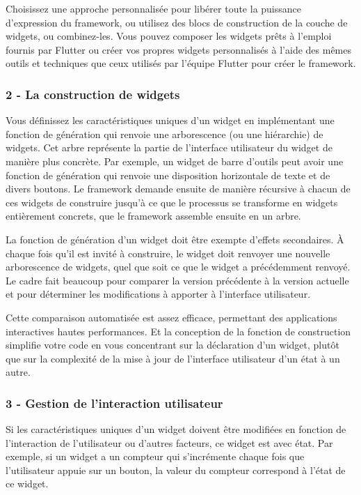 Choisissez une approche personnalisée pour libérer toute la puissance d'expression du framework, ou utilisez des blocs de construction de la couche de widgets, ou combinez-les. Vous pouvez composer les widgets prêts à l'emploi fournis par Flutter ou créer vos propres widgets personnalisés à l'aide des mêmes outils et techniques que ceux utilisés par l'équipe Flutter pour créer le framework.

\subsubsection{{\large 2 - La construction de widgets}}
Vous définissez les caractéristiques uniques d'un widget en implémentant une fonction de génération qui renvoie une arborescence (ou une hiérarchie) de widgets. Cet arbre représente la partie de l’interface utilisateur du widget de manière plus concrète. Par exemple, un widget de barre d'outils peut avoir une fonction de génération qui renvoie une disposition horizontale de texte et de divers boutons. Le framework demande ensuite de manière récursive à chacun de ces widgets de construire jusqu'à ce que le processus se transforme en widgets entièrement concrets, que le framework assemble ensuite en un arbre.\medskip

La fonction de génération d’un widget doit être exempte d’effets secondaires. À chaque fois qu'il est invité à construire, le widget doit renvoyer une nouvelle arborescence de widgets, quel que soit ce que le widget a précédemment renvoyé. Le cadre fait beaucoup pour comparer la version précédente à la version actuelle et pour déterminer les modifications à apporter à l'interface utilisateur.\medskip

Cette comparaison automatisée est assez efficace, permettant des applications interactives hautes performances. Et la conception de la fonction de construction simplifie votre code en vous concentrant sur la déclaration d'un widget, plutôt que sur la complexité de la mise à jour de l'interface utilisateur d'un état à un autre.

\subsubsection{{\large 3 - Gestion de l'interaction utilisateur}}
Si les caractéristiques uniques d'un widget doivent être modifiées en fonction de l'interaction de l'utilisateur ou d'autres facteurs, ce widget est avec état. Par exemple, si un widget a un compteur qui s'incrémente chaque fois que l'utilisateur appuie sur un bouton, la valeur du compteur correspond à l'état de ce widget.\medskip
 
